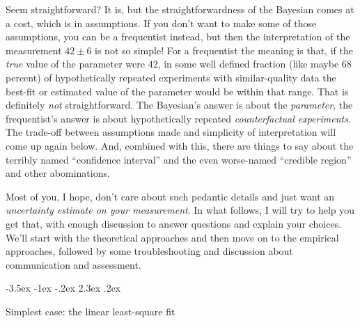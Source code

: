\documentclass[10pt]{article}
\makeatletter
\renewcommand\section{\@startsection {section}{1}{\z@}%
  {-3.5ex \@plus -1ex \@minus -.2ex}%
  {2.3ex \@plus.2ex}%
  {\raggedright\normalfont\Large\bfseries}}
\makeatother
\begin{document}
Seem straightforward? It is, but the straightforwardness of the Bayesian
comes at a cost, which is in assumptions. If you don't want to make some
of those assumptions, you can be a frequentist instead, but then the
interpretation of the measurement $42\pm 6$ is not so simple! For a frequentist
the meaning is that, if the \emph{true}
value of the parameter were $42$,
in some well defined fraction (like maybe 68\,percent)
of hypothetically repeated experiments with similar-quality data the
best-fit or estimated value of the parameter would be within that range.
That is definitely \emph{not} straightforward.
The Bayesian's answer is about the \emph{parameter}, the frequentist's
answer is about hypothetically repeated \emph{counterfactual experiments}.
The trade-off between assumptions made and
simplicity of interpretation will come up again below.
And, combined with this, there are things to say about the terribly named
``confidence interval'' and the even worse-named ``credible region'' and other
abominations.

Most of you, I hope, don't care about such pedantic details and just
want an \emph{uncertainty estimate on your measurement}. In what follows,
I will try to help you get that, with enough discussion to answer questions
and explain your choices. We'll start with the theoretical approaches and
then move on to the empirical approaches, followed by some troubleshooting and
discussion about communication and assessment.

\section{Simplest case: the linear least-square fit}\label{sec:standard}
\end{document}

